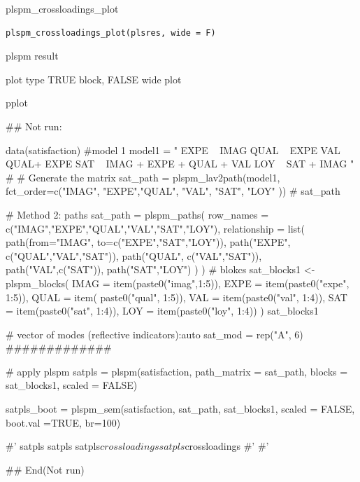 \documentclass[a4paper]{book}
\begin{document}
%
\begin{Description}
plspm\_crossloadings\_plot
\end{Description}
%
\begin{Usage}
\begin{verbatim}
plspm_crossloadings_plot(plsres, wide = F)
\end{verbatim}
\end{Usage}
%
\begin{Arguments}
\begin{ldescription}
\item[\code{plsres}] plspm result

\item[\code{wide}] plot type TRUE block, FALSE wide plot
\end{ldescription}
\end{Arguments}
%
\begin{Value}
pplot
\end{Value}
%
\begin{Examples}
\begin{ExampleCode}


\#\# Not run: 

data(satisfaction)
#model 1
model1 = "
EXPE ~ IMAG
QUAL ~ EXPE
VAL ~  QUAL+ EXPE
SAT ~ IMAG + EXPE + QUAL + VAL
LOY ~ SAT + IMAG
"
# # Generate the matrix
sat_path = plspm_lav2path(model1,
                          fct_order=c("IMAG", "EXPE","QUAL", "VAL", "SAT", "LOY" ))
# sat_path

# Method 2: paths
sat_path = plspm_paths(
  row_names = c("IMAG","EXPE","QUAL","VAL","SAT","LOY"),
  relationship = list(
    path(from="IMAG", to=c("EXPE","SAT","LOY")),
    path("EXPE", c("QUAL","VAL","SAT")),
    path("QUAL", c("VAL","SAT")),
    path("VAL",c("SAT")),
    path("SAT","LOY")
  )
)
# blokcs
sat_blocks1 <- plspm_blocks(
  IMAG = item(paste0("imag",1:5)),
  EXPE = item(paste0("expe", 1:5)),
  QUAL = item( paste0("qual", 1:5)),
  VAL = item(paste0("val", 1:4)),
  SAT = item(paste0("sat", 1:4)),
  LOY = item(paste0("loy", 1:4))
)
sat_blocks1

# vector of modes (reflective indicators):auto
sat_mod = rep("A", 6)
#############

# apply plspm
satpls = plspm(satisfaction,
                   path_matrix = sat_path,
                   blocks = sat_blocks1,
                   scaled = FALSE)

satpls_boot = plspm_sem(satisfaction, sat_path, sat_blocks1, scaled = FALSE,
                        boot.val =TRUE, br=100)


#'
satpls %
satpls %
satpls$crossloadings %
satpls$crossloadings %
#'
#'

## End(Not run)

\end{ExampleCode}
\end{Examples}
\end{document}
